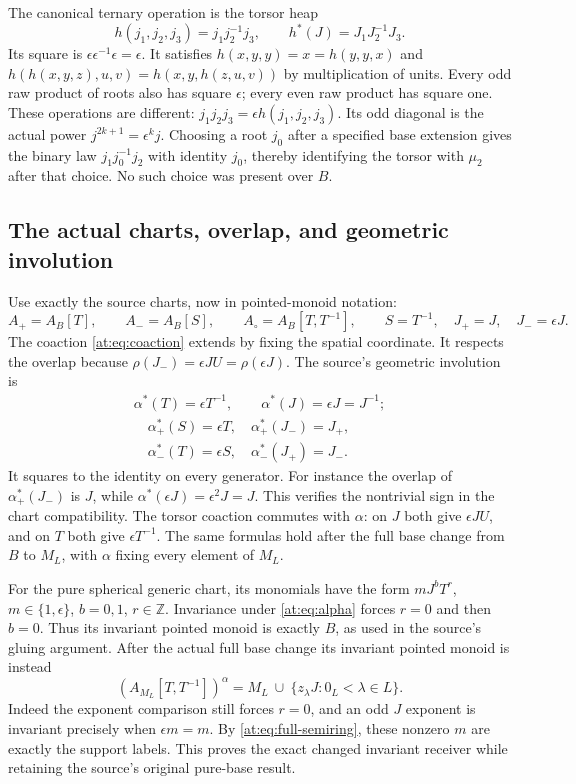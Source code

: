 \documentclass[11pt,a4paper]{article}
\theoremstyle{definition}\newtheorem{definition}[theorem]{Definition}
\newcommand{\Z}{\mathbb Z}\newcommand{\Q}{\mathbb Q}
\begin{document}
The canonical ternary operation is the torsor heap
\[
 h(j_1,j_2,j_3)=j_1j_2^{-1}j_3,
 \qquad h^*(J)=J_1J_2^{-1}J_3.
 \tag{AT14}\label{at:eq:heap}
\]
Its square is $\epsilon\epsilon^{-1}\epsilon=\epsilon$.
It satisfies $h(x,y,y)=x=h(y,y,x)$ and
$h(h(x,y,z),u,v)=h(x,y,h(z,u,v))$ by multiplication of units.
Every odd raw product of roots also has square $\epsilon$;
every even raw product has square one. These operations are
different: $j_1j_2j_3=\epsilon h(j_1,j_2,j_3)$. Its odd
diagonal is the actual power $j^{2k+1}=\epsilon^kj$.
Choosing a root $j_0$ after a specified base extension gives
the binary law $j_1j_0^{-1}j_2$ with identity $j_0$, thereby
identifying the torsor with $\mu_2$ after that choice. No such
choice was present over $B$.

\subsection{The actual charts, overlap, and geometric involution}

Use exactly the source charts, now in pointed-monoid notation:
\[
 A_+=A_B[T],\qquad A_-=A_B[S],\qquad
 A_\circ=A_B[T,T^{-1}],\qquad
 S=T^{-1},\quad J_+=J,\quad J_-=\epsilon J.
 \tag{AT15}\label{at:eq:charts}
\]
The coaction \eqref{at:eq:coaction} extends by fixing the spatial
coordinate. It respects the overlap because
$\rho(J_-)=\epsilon JU=\rho(\epsilon J)$.
The source's geometric involution is
\[
 \begin{gathered}\alpha^*(T)=\epsilon T^{-1},\qquad
 \alpha^*(J)=\epsilon J=J^{-1};\\
 \quad
 \alpha_+^*(S)=\epsilon T,\quad\alpha_+^*(J_-)=J_+,\\
 \quad
 \alpha_-^*(T)=\epsilon S,\quad\alpha_-^*(J_+)=J_-.
 \end{gathered}\tag{AT16}\label{at:eq:alpha}
\]
It squares to the identity on every generator. For instance the
overlap of $\alpha_+^*(J_-)$ is $J$, while
$\alpha^*(\epsilon J)=\epsilon^2J=J$. This verifies the
nontrivial sign in the chart compatibility. The torsor coaction
commutes with $\alpha$: on $J$ both give $\epsilon JU$, and
on $T$ both give $\epsilon T^{-1}$. The same formulas hold
after the full base change from $B$ to $M_L$, with $\alpha$
fixing every element of $M_L$.

For the pure spherical generic chart, its monomials have the
form $mJ^bT^r$, $m\in\{1,\epsilon\}$, $b=0,1$, $r\in\Z$.
Invariance under \eqref{at:eq:alpha} forces $r=0$ and then $b=0$.
Thus its invariant pointed monoid is exactly $B$, as used in
the source's gluing argument. After the actual full base change
its invariant pointed monoid is instead
\[
 (A_{M_L}[T,T^{-1}])^\alpha
    =M_L\ \cup\ \{z_\lambda J:0_L<\lambda\in L\}.
 \tag{AT17}\label{at:eq:full-invariants}
\]
Indeed the exponent comparison still forces $r=0$, and an odd
$J$ exponent is invariant precisely when $\epsilon m=m$.
By \eqref{at:eq:full-semiring}, these nonzero $m$ are exactly
the support labels. This proves the exact changed invariant
receiver while retaining the source's original pure-base result.
\end{document}
